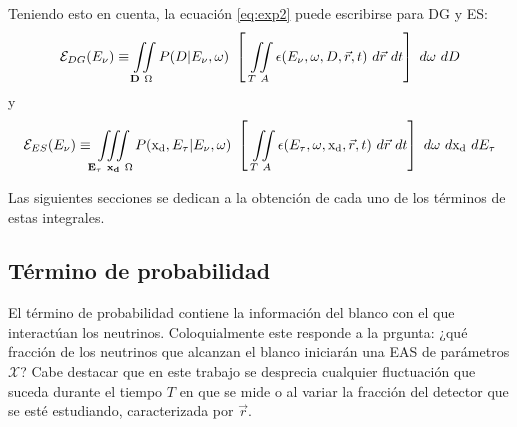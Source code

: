 	Teniendo esto en cuenta, la ecuación \ref{eq:exp2} puede escribirse para DG y ES:
	\begin{equation}
	 {\cal E}_{DG}(E_\nu)\equiv\iint\limits_{\mathbf{D}~\Omega}P(D|E_{\nu},\omega)~
	 \left[~
	 \iint\limits_{T~A}\epsilon(E_{\nu},\omega,D,\vec{r},t)~d\vec{r}~dt
	 \right]
	 ~d\omega~dD
	 \label{eq:exp4DG}
	\end{equation}
	y
	\begin{equation}
	 {\cal E}_{ES}(E_\nu)\equiv\iiint\limits_{\mathbf{E_\tau}~\mathbf{x_d}~\Omega}P({\rm x_d},E_\tau|E_{\nu},\omega)~
	 \left[~
	 \iint\limits_{T~A}\epsilon(E_\tau,\omega,{\rm x_d},\vec{r},t)~d\vec{r}~dt
	 \right]
	 ~d\omega~d{\rm x_d}~dE_\tau
	 \label{eq:exp4ES}
	\end{equation}
	
	Las siguientes secciones se dedican a la obtención de cada uno de los términos de estas integrales.
	
	\subsection{Término de probabilidad}
	
	El t\'ermino de probabilidad contiene la informaci\'on del blanco con el que interact\'uan los neutrinos. 
% 	
	Coloquialmente este responde a la prgunta: ¿qu\'e fracci\'on de los neutrinos que alcanzan el blanco iniciar\'an una EAS de par\'ametros $\mathcal{X}$?
	Cabe destacar que en este trabajo se desprecia cualquier fluctuaci\'on que suceda durante el tiempo $T$ en que se mide o al variar la fracción del detector que se esté estudiando, caracterizada por $\vec{r}$.
	
